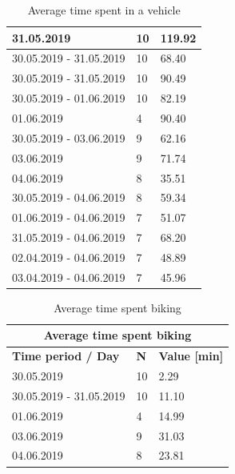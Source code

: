 \begin{table}[]
{\begin{tabular}{|l|l|l|}
			31.05.2019                 & 10         & 119.92                   \\ \hline
			30.05.2019 - 31.05.2019    & 10         & 68.40                    \\ \hline
			30.05.2019 - 31.05.2019    & 10         & 90.49                    \\ \hline
			30.05.2019 - 01.06.2019    & 10         & 82.19                    \\ \hline
			01.06.2019                 & 4          & 90.40                    \\ \hline
			30.05.2019 - 03.06.2019    & 9          & 62.16                    \\ \hline
			03.06.2019                 & 9          & 71.74                    \\ \hline
			04.06.2019                 & 8          & 35.51                    \\ \hline
			30.05.2019 - 04.06.2019    & 8          & 59.34                    \\ \hline
			01.06.2019 - 04.06.2019    & 7          & 51.07                    \\ \hline
			31.05.2019 - 04.06.2019    & 7          & 68.20                    \\ \hline
			02.04.2019 - 04.06.2019    & 7          & 48.89                    \\ \hline
			03.04.2019 - 04.06.2019    & 7          & 45.96                    \\ \hline
		\end{tabular}
		\label{results-vehicle}
		\caption{Average time spent in a vehicle}
	}
\end{table}

\begin{table}[]
	\centering
	\begin{tabular}{|l|l|l|}
		\hline
		\multicolumn{3}{|c|}{\textbf{Average time spent biking}}           \\ \hline
		\textbf{Time period / Day} & \textbf{N} & \textbf{Value {[}min{]}} \\ \hline
		30.05.2019                 & 10         & 2.29                     \\ \hline
		30.05.2019 - 31.05.2019    & 10         & 11.10                    \\ \hline
		01.06.2019                 & 4          & 14.99                    \\ \hline
		03.06.2019                 & 9          & 31.03                    \\ \hline
		04.06.2019                 & 8          & 23.81                    \\ \hline
	\end{tabular}
	\label{results-biking}
	\caption{Average time spent biking}
\end{table}

